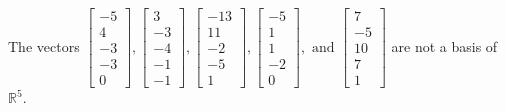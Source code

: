 \begin{exercise}
\begin{exerciseStatement}
  \end{exerciseStatement}
  \begin{exerciseAnswer}
   The vectors \(\left[\begin{array}{r}
-5 \\
4 \\
-3 \\
-3 \\
0
\end{array}\right] , \left[\begin{array}{r}
3 \\
-3 \\
-4 \\
-1 \\
-1
\end{array}\right] , \left[\begin{array}{r}
-13 \\
11 \\
-2 \\
-5 \\
1
\end{array}\right] , \left[\begin{array}{r}
-5 \\
1 \\
1 \\
-2 \\
0
\end{array}\right] , \text{ and } \left[\begin{array}{r}
7 \\
-5 \\
10 \\
7 \\
1
\end{array}\right]\) 
  	 are not  a basis of \(\mathbb{R}^5\).
  


  \end{exerciseAnswer}
\end{exercise}